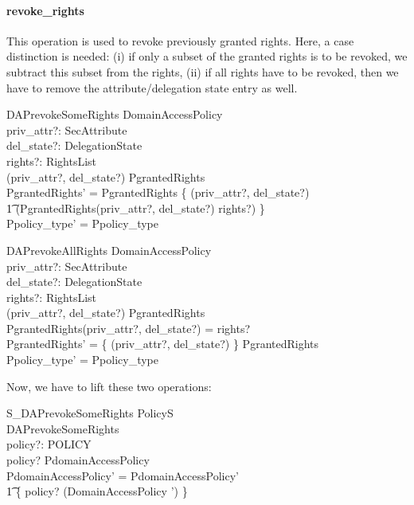 \paragraph{revoke\_rights}
This operation is used to revoke previously granted rights.  Here, a case
distinction is needed: (i) if only a subset of the granted rights is to be
revoked, we subtract this subset from the rights, (ii) if all rights have to be
revoked, then we have to remove the attribute/delegation state entry as well.
\begin{schema}{DAPrevokeSomeRights}
  \Delta DomainAccessPolicy \\
  priv\_attr?: SecAttribute \\
  del\_state?: DelegationState \\
  rights?: RightsList \\
  \where
  (priv\_attr?, del\_state?) \in \dom PgrantedRights \\
  PgrantedRights' = PgrantedRights \oplus \{ (priv\_attr?, del\_state?) \mapsto \\
  \t1 (PgrantedRights(priv\_attr?, del\_state?) \setminus \ran rights?) \} \\
  Ppolicy\_type' = Ppolicy\_type \\
\end{schema}
\begin{schema}{DAPrevokeAllRights}
  \Delta DomainAccessPolicy \\
  priv\_attr?: SecAttribute \\
  del\_state?: DelegationState \\
  rights?: RightsList \\
  \where
  (priv\_attr?, del\_state?) \in \dom PgrantedRights \\
  PgrantedRights(priv\_attr?, del\_state?) = \ran rights? \\
  PgrantedRights' = \{ (priv\_attr?, del\_state?) \} \ndres PgrantedRights \\
  Ppolicy\_type' = Ppolicy\_type \\
\end{schema}
Now, we have to lift these two operations:
\begin{schema}{S\_DAPrevokeSomeRights}
  \Delta PolicyS \\
  DAPrevokeSomeRights \\
  policy?: POLICY \\
  \where  
  policy? \in \dom PdomainAccessPolicy \\
  PdomainAccessPolicy' = PdomainAccessPolicy' \oplus \\
  \t1 \{ policy? \mapsto (\theta DomainAccessPolicy ') \}\\ 
\end{schema}
